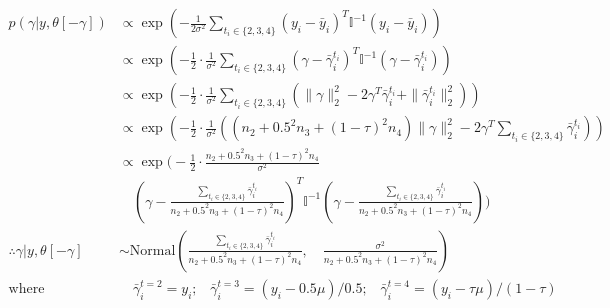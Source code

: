 \documentclass[12pt,letterpaper,twoside]{article}
\begin{document}
\begin{align*}
    p(\gamma|y,\theta[-\gamma]) & \propto \exp\left(-\frac{1}{2\sigma^2} \sum_{t_i \in \{2,3,4\}} (y_i - \bar{y}_i)^T \mathbb{I}^{-1} (y_i - \bar{y}_i) \right) \\ %
        & \propto \exp\left(-\frac{1}{2} \cdot \frac{1}{\sigma^2} \sum_{t_i \in \{2,3,4\}} (\gamma - \bar{\gamma}_i^{t_i})^T \mathbb{I}^{-1} (\gamma - \bar{\gamma}_i^{t_i}) \right) \\ %
        & \propto \exp\left(-\frac{1}{2} \cdot \frac{1}{\sigma^2} \sum_{t_i \in \{2,3,4\}} \left(\|\gamma\|^2_2 - 2\gamma^T \bar{\gamma}_i^{t_i} + \|\bar{\gamma}_i^{t_i}\|^2_2 \right)\right) \\ %
        & \propto \exp\left(-\frac{1}{2} \cdot \frac{1}{\sigma^2} \left((n_2 + 0.5^2 n_3 + (1-\tau)^2 n_4)\|\gamma\|^2_2 - 2\gamma^T \sum_{t_i \in \{2,3,4\}} \bar{\gamma}_i^{t_i} \right)\right) \\ %
        & \propto \exp\biggl(-\frac{1}{2} \cdot \frac{n_2 + 0.5^2 n_3 + (1-\tau)^2 n_4}{\sigma^2} \\ %
        & \quad \left(\gamma - \frac{\sum_{t_i \in \{2,3,4\}} \bar{\gamma}_i^{t_i}}{n_2 + 0.5^2 n_3 + (1-\tau)^2 n_4} \right)^T \mathbb{I}^{-1} \left(\gamma - \frac{\sum_{t_i \in \{2,3,4\}} \bar{\gamma}_i^{t_i}}{n_2 + 0.5^2 n_3 + (1-\tau)^2 n_4} \right)\biggr) && \\
    \therefore \gamma | y, \theta[-\gamma] & \sim \text{Normal}\left( \frac{\sum_{t_i \in \{2,3,4\}} \bar{\gamma}_i^{t_i}}{n_2 + 0.5^2 n_3 + (1-\tau)^2 n_4}, \quad \frac{\sigma^2}{n_2 + 0.5^2 n_3 + (1-\tau)^2 n_4} \right) \\
    \text{where} & \quad \bar{\gamma}_i^{t=2} = y_i \text{;} \quad \bar{\gamma}_i^{t=3} = (y_i - 0.5\mu) / 0.5 \text{;} \quad \bar{\gamma}_i^{t=4} = (y_i - \tau\mu) / (1-\tau) 
\end{align*}
\end{document}

